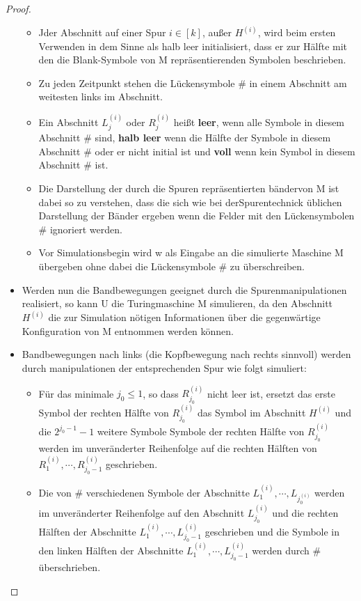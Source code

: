 \begin{proof}
\begin{itemize}
\begin{itemize}
                    \item Jder Abschnitt auf einer Spur \(i \in [k]\), außer \(H^{(i)}\), wird beim ersten Verwenden in dem Sinne als halb leer initialisiert, dass er zur Hälfte mit den die Blank-Symbole von M repräsentierenden Symbolen beschrieben.
                    \item Zu jeden Zeitpunkt stehen die Lückensymbole \# in einem Abschnitt am weitesten links im Abschnitt.
                    \item Ein Abschnitt \(L_j^{(i)}\) oder \(R_j^{(i)}\) heißt \textbf{leer}, wenn alle Symbole in diesem Abschnitt \# sind, \textbf{halb leer} wenn die Hälfte der Symbole in diesem Abschnitt \# oder er nicht initial ist und \textbf{voll} wenn kein Symbol in diesem Abschnitt \# ist.
                    \item Die Darstellung der durch die Spuren repräsentierten bändervon M ist dabei so zu verstehen, dass die sich wie bei derSpurentechnick üblichen Darstellung der Bänder ergeben wenn die Felder mit den Lückensymbolen \# ignoriert werden.
                    \item Vor Simulationsbegin wird w als Eingabe an die simulierte Maschine M übergeben ohne dabei die Lückensymbole \# zu überschreiben. 
                \end{itemize}
                \item Werden nun die Bandbewegungen geeignet durch die Spurenmanipulationen realisiert, so kann U die Turingmaschine M simulieren, da den Abschnitt \(H^{(i)}\) die zur Simulation nötigen Informationen über die gegenwärtige Konfiguration von M entnommen werden können.
                \item Bandbewegungen nach links (die Kopfbewegung nach rechts sinnvoll) werden durch manipulationen der entsprechenden Spur wie folgt simuliert:
                \begin{itemize}
                    \item Für das minimale \(j_0 \leq 1\), so dass \(R_{j_0}^{(i)}\) nicht leer ist, ersetzt das erste Symbol der rechten Hälfte von \(R_{j_0}^{(i)}\) das Symbol im Abschnitt \(H^{(i)}\) und die \(2^{j_0 - 1}-1\) weitere Symbole Symbole der rechten Hälfte von \(R_{j_0}^{(i)}\) werden im unveränderter Reihenfolge auf die rechten Hälften von \(R_1^{(i)}, \cdots, R_{j_0-1}^{(i)}\) geschrieben.
                    \item Die von \# verschiedenen Symbole der Abschnitte \(L_1^{(i)}, \cdots, L_{j_0^{(i)}}\) werden im unveränderter Reihenfolge auf den Abschnitt \(L_{j_0}^{(i)}\) und die rechten Hälften der Abschnitte \(L_1^{(i)}, \cdots, L_{j_0 -1}^{(i)}\) geschrieben und die Symbole in den linken Hälften der Abschnitte \(L_1^{(i)}, \cdots, L_{j_0 -1}^{(i)}\) werden durch \# überschrieben.

\end{itemize}
\end{itemize}
\end{proof}
